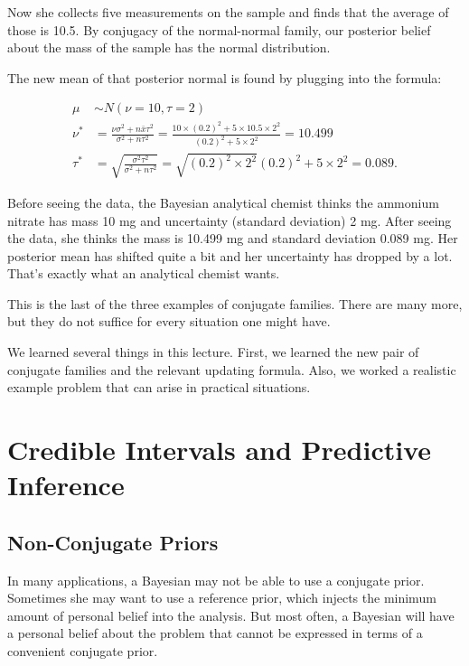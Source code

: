 \documentclass[]{book}
\theoremstyle{definition}
\theoremstyle{definition}
\theoremstyle{definition}
\theoremstyle{remark}
\begin{document}
Now she collects five measurements on the sample and finds that the
average of those is 10.5. By conjugacy of the normal-normal family, our
posterior belief about the mass of the sample has the normal
distribution.

The new mean of that posterior normal is found by plugging into the
formula:

\[\begin{aligned}
\mu &\sim N(\nu=10, \tau=2) \\
\nu^*  &= \frac{\nu\sigma^2 + n\bar{x}\tau^2}{\sigma^2 + n\tau^2} = \frac{10\times(0.2)^2+5\times10.5\times2^2}{(0.2)^2+5\times2^2} = 10.499\\
\tau^* &= \sqrt{\frac{\sigma^2\tau^2}{\sigma^2 + n\tau^2}} = \sqrt{(0.2)^2\times2^2}{(0.2)^2+5\times2^2} = 0.089.
\end{aligned}\]

Before seeing the data, the Bayesian analytical chemist thinks the
ammonium nitrate has mass 10 mg and uncertainty (standard deviation) 2
mg. After seeing the data, she thinks the mass is 10.499 mg and standard
deviation 0.089 mg. Her posterior mean has shifted quite a bit and her
uncertainty has dropped by a lot. That's exactly what an analytical
chemist wants.

This is the last of the three examples of conjugate families. There are
many more, but they do not suffice for every situation one might have.

We learned several things in this lecture. First, we learned the new
pair of conjugate families and the relevant updating formula. Also, we
worked a realistic example problem that can arise in practical
situations.

\section{Credible Intervals and Predictive
Inference}\label{credible-intervals-and-predictive-inference}

\subsection{Non-Conjugate Priors}\label{non-conjugate-priors}

In many applications, a Bayesian may not be able to use a conjugate
prior. Sometimes she may want to use a reference prior, which injects
the minimum amount of personal belief into the analysis. But most often,
a Bayesian will have a personal belief about the problem that cannot be
expressed in terms of a convenient conjugate prior.
\end{document}
